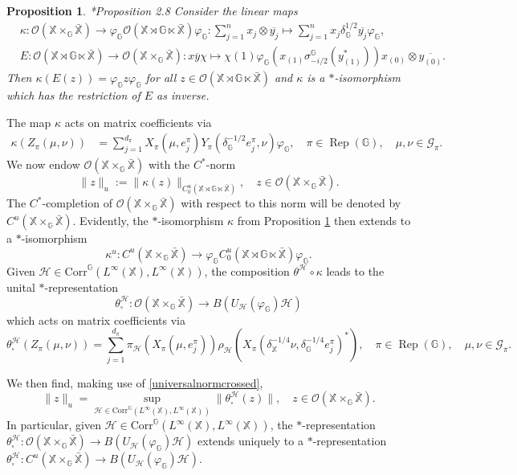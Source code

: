 \documentclass[reqno]{amsart}
\numberwithin{equation}{section}
\newtheorem{Prop}[Theorem]{Proposition}
\newcommand\XGX{\X\times_\G \bar{\X}}
\newcommand\XrX{\X\rtimes\G \ltimes\bar{\X}}
\DeclareMathOperator{\Rep}{\mathrm{Rep}}
\newcommand{\mcG}{\mathcal{G}}
\newcommand{\mcH}{\mathcal{H}}
\newcommand{\mcO}{\mathcal{O}}
\newcommand{\G}{\mathbb{G}}
\newcommand{\X}{\mathbb{X}}
\newcommand{\Corr}{\mathrm{Corr}}
\begin{document}
\begin{Prop}\label{corner} \cite{DCDR25}*{Proposition 2.8}
    Consider the linear maps
\begin{align*}
    &\kappa\colon \mcO(\XGX)\to \varphi_\G\mcO(\XrX)\varphi_\G\colon \sum_{j=1}^{n} x_j\otimes \overline{y_j} \mapsto \sum_{j=1}^n x_j \delta_\G^{1/2} \overline{y_j} \varphi_\G,\\
    &E\colon \mcO(\XrX)\to \mcO(\XGX)\colon x\overline{y}\chi\mapsto \chi(1)\varphi_\G(x_{(1)}\sigma_{-i/2}^\G(y_{(1)}^*))x_{(0)}\otimes  \overline{y_{(0)}}.
\end{align*}
Then $\kappa(E(z))= \varphi_\G z \varphi_\G$  for all $z\in \mcO(\XrX)$ and $\kappa$ is a $*$-isomorphism which has the restriction of $E$ as inverse.
\end{Prop}
The map $\kappa$ acts on matrix coefficients via
\begin{align}
    \label{kappamatrix}\kappa(Z_\pi(\mu, \nu)) &= \sum_{j=1}^{d_\pi} X_\pi(\mu, e_j^\pi) Y_\pi(\delta_\G^{-1/2} e_j^\pi,\nu)\varphi_\G, \quad \pi \in \Rep(\G), \quad \mu, \nu \in \mcG_\pi.
\end{align}
We now endow $\mcO(\XGX)$ with the $C^*$-norm
$$\|z\|_u:= \|\kappa(z)\|_{C^u_0(\XrX)}, \quad z\in \mcO(\XGX).$$
The $C^*$-completion of $\mcO(\XGX)$ with respect to this norm will be denoted by $C^u(\XGX)$. Evidently, the $*$-isomorphism $\kappa$ from Proposition \ref{corner} then extends to a $*$-isomorphism
$$\kappa^u: C^u(\XGX)\to \varphi_\G C^u_0(\XrX)\varphi_\G.$$
Given $\mcH\in \Corr^\G(L^\infty(\X), L^\infty(\X))$, the composition $\theta^\mcH\circ \kappa$ leads to the unital $*$-representation $$\theta_\square^\mcH: \mcO(\XGX)\to B(U_\mcH(\varphi_\G)\mcH)$$ which acts on matrix coefficients via
\begin{equation}\label{usethis}
\theta_\square^{\mcH}(Z_\pi(\mu, \nu)) = \sum_{j=1}^{d_\pi} \pi_\mcH(X_\pi(\mu, e_j^\pi)) \rho_\mcH(X_\pi(\delta_\X^{-1/4}\nu, \delta_\G^{-1/4}e_j^\pi)^*), \quad \pi \in \Rep(\G), \quad \mu, \nu \in \mcG_\pi.    
\end{equation}

We then find, making use of \eqref{universalnormcrossed},
\begin{equation}\label{cornernorm}
    \|z\|_u = \sup_{\mcH \in \Corr^\G(L^\infty(\X), L^\infty(\X))} \|\theta_\square^{\mcH}(z)\|, \quad z \in \mcO(\XGX).
\end{equation}
In particular, given $\mcH\in \Corr^\G(L^\infty(\X), L^\infty(\X))$, the $*$-representation $\theta_\square^\mcH: \mcO(\XGX)\to B(U_\mcH(\varphi_\G)\mcH)$ extends uniquely to a $*$-representation $\theta_\square^\mcH: C^u(\XGX)\to B(U_\mcH(\varphi_\G)\mcH)$.
\end{document}

